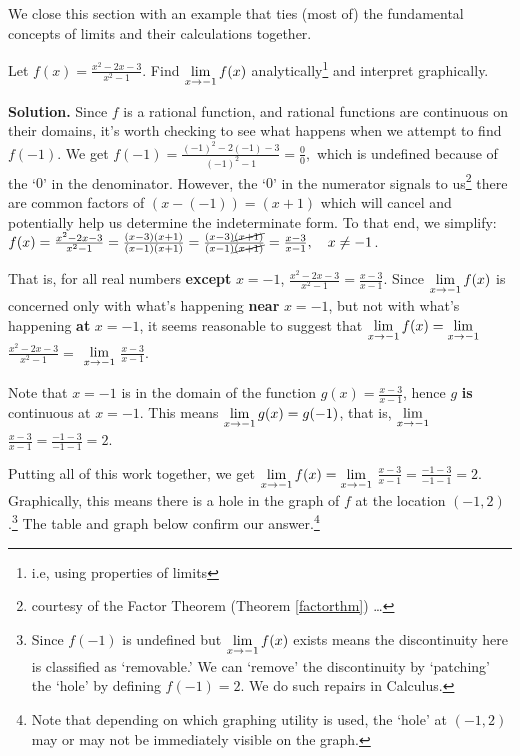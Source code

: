 \documentclass{ximera}
\begin{document}
\medskip

We close this section with an example that ties (most of) the fundamental concepts of limits and their calculations together.

\medskip

\begin{ex} \label{rationallimit}  Let  $f(x) =  \frac{x^2-2x-3}{x^2-1}$.  Find $\ds{\lim_{x \rightarrow -1} f(x)}$ analytically\footnote{i.e, using properties of limits} and interpret graphically.

\medskip

{\bf Solution.}  Since $f$ is a rational function, and rational functions are continuous on their domains, it's worth checking to see what happens when we attempt to find $f(-1)$.  We get  $f(-1) = \frac{(-1)^2 - 2(-1)-3}{(-1)^2-1} = \frac{0}{0},$ which is undefined because of the `$0$' in the denominator.  However, the `$0$' in the numerator signals to us\footnote{courtesy of the Factor Theorem (Theorem \ref{factorthm}) \ldots} there are common factors of $(x-(-1)) = (x+1)$ which will cancel and potentially help us determine the indeterminate form.  To that end, we simplify: $f(x) =  \frac{x^2-2x-3}{x^2-1} = \frac{(x-3)(x+1)}{(x-1)(x+1)} = \frac{(x-3)\cancel{(x+1)}}{(x-1)\cancel{(x+1)}} = \frac{x-3}{x-1}, \quad x \neq -1$. 

\medskip

That is, for all real numbers \textbf{except} $x = -1$, $\frac{x^2-2x-3}{x^2-1} = \frac{x-3}{x-1}$.   Since $\ds{\lim_{x \rightarrow -1} f(x)}$ is concerned only with what's happening \textbf{near} $x = -1$, but not with what's happening \textbf{at} $x = -1$, it seems reasonable to suggest that $\ds{\lim_{x \rightarrow -1} f(x) =  \lim_{x \rightarrow -1}}$  $\frac{x^2-2x-3}{x^2-1} =$  $\ds{\lim_{x \rightarrow -1}}$ $\frac{x-3}{x-1}$.

\medskip

Note that $x = -1$ is in the domain of the function $g(x) = \frac{x-3}{x-1}$, hence $g$  \textbf{is} continuous at $x = -1$.   This means $\ds{\lim_{x \rightarrow -1} g(x) = g(-1)}$, that is, $\ds{\lim_{x \rightarrow -1}}$ $\frac{x-3}{x-1} = \frac{-1-3}{-1-1} = 2$.

\medskip

Putting all of this work together, we get $\ds{\lim_{x \rightarrow -1} f(x) =   \lim_{x \rightarrow -1}}$ $ \frac{x-3}{x-1}  =  \frac{-1-3}{-1-1} = 2$.   Graphically, this means there is a hole in the graph of $f$ at the location $(-1,2)$.\footnote{Since $f(-1)$ is undefined but  $\ds{\lim_{x \rightarrow -1} f(x)}$ exists means the discontinuity here is classified as `removable.'  We can `remove' the discontinuity by `patching' the `hole' by defining $f(-1) = 2$. We do such repairs in Calculus.}  The table and graph below confirm our answer.\footnote{Note that depending on which graphing utility is used, the `hole' at $(-1,2)$ may or may not be immediately visible on the graph.}


\end{ex}
\end{document}
